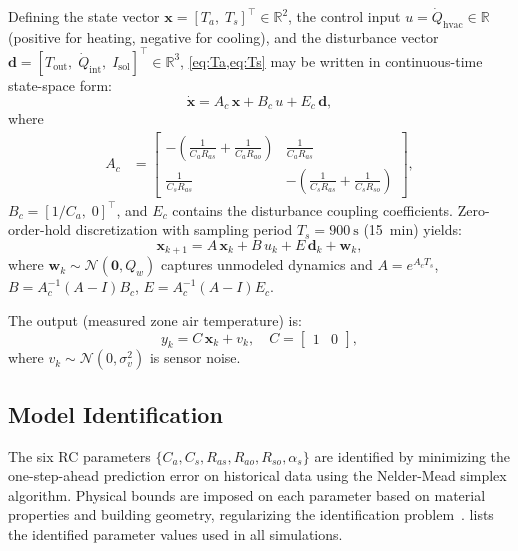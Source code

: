 \documentclass[conference,a4paper]{IEEEtran}[2015/08/26]
\newcommand{\R}{\mathbb{R}}
\newcommand{\vek}[1]{\bm{#1}}
\begin{document}
Defining the state vector $\vek{x} = [T_a,\; T_s]^\top \in \R^2$,
the control input $u = \dot{Q}_{\text{hvac}} \in \R$ (positive for
heating, negative for cooling), and the disturbance vector
$\vek{d} = [T_{\text{out}},\; \dot{Q}_{\text{int}},\; I_{\text{sol}}]^\top \in \R^3$,
\cref{eq:Ta,eq:Ts} may be written in continuous-time state-space form:
\begin{equation}
  \dot{\vek{x}} = A_c\, \vek{x} + B_c\, u + E_c\, \vek{d},
  \label{eq:ss_cont}
\end{equation}
where
\begin{align}
  A_c &= \begin{bmatrix}
           -\!\left(\tfrac{1}{C_a R_{as}} + \tfrac{1}{C_a R_{ao}}\right) & \tfrac{1}{C_a R_{as}} \\[4pt]
           \tfrac{1}{C_s R_{as}} & -\!\left(\tfrac{1}{C_s R_{as}} + \tfrac{1}{C_s R_{so}}\right)
         \end{bmatrix},
  \label{eq:Ac}
\end{align}
$B_c = [1/C_a,\; 0]^\top$, and $E_c$ contains the disturbance coupling
coefficients. Zero-order-hold discretization with sampling period
$T_s = \SI{900}{\second}$ (\SI{15}{min}) yields:
\begin{equation}
  \vek{x}_{k+1} = A\,\vek{x}_k + B\,u_k + E\,\vek{d}_k + \vek{w}_k,
  \label{eq:ss_disc}
\end{equation}
where $\vek{w}_k \sim \mathcal{N}(\vek{0}, Q_w)$ captures unmodeled
dynamics and $A = e^{A_c T_s}$, $B = A_c^{-1}(A - I)B_c$,
$E = A_c^{-1}(A - I)E_c$.

The output (measured zone air temperature) is:
\begin{equation}
  y_k = C\,\vek{x}_k + v_k, \quad
  C = \begin{bmatrix} 1 & 0 \end{bmatrix},
  \label{eq:output}
\end{equation}
where $v_k \sim \mathcal{N}(0, \sigma_v^2)$ is sensor noise.

\subsection{Model Identification}

The six RC parameters $\{C_a, C_s, R_{as}, R_{ao}, R_{so}, \alpha_s\}$
are identified by minimizing the one-step-ahead prediction error on
historical data using the Nelder-Mead simplex algorithm. Physical bounds
are imposed on each parameter based on material properties and building
geometry, regularizing the identification problem~\cite{Bacher2011}.
 lists the identified parameter values used in all
simulations.
\end{document}
